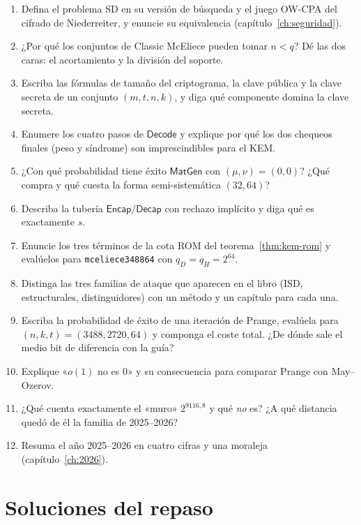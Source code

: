 \documentclass[11pt,a4paper,oneside]{report}
\begin{document}
\begin{enumerate}[leftmargin=1.9em,itemsep=5pt]
  \item Defina el problema SD en su versión de búsqueda y el juego
        OW-CPA del cifrado de Niederreiter, y enuncie su equivalencia
        (capítulo~\ref{ch:seguridad}).
  \item ¿Por qué los conjuntos de Classic McEliece pueden tomar
        $n<q$? Dé las dos caras: el acortamiento y la división del
        soporte.
  \item Escriba las fórmulas de tamaño del criptograma, la clave
        pública y la clave secreta de un conjunto $(m,t,n,k)$, y
        diga qué componente domina la clave secreta.
  \item Enumere los cuatro pasos de $\textsf{Decode}$ y explique por
        qué los dos chequeos finales (peso y síndrome) son
        imprescindibles para el KEM.
  \item ¿Con qué probabilidad tiene éxito $\textsf{MatGen}$ con
        $(\mu,\nu)=(0,0)$? ¿Qué compra y qué cuesta la forma
        semi-sistemática $(32,64)$?
  \item Describa la tubería $\textsf{Encap}/\textsf{Decap}$ con
        rechazo implícito y diga qué es exactamente $s$.
  \item Enuncie los tres términos de la cota ROM del
        teorema~\ref{thm:kem-rom} y evalúelos para
        \texttt{mceliece348864} con $q_D=q_H=2^{64}$.
  \item Distinga las tres familias de ataque que aparecen en el
        libro (ISD, estructurales, distinguidores) con un método y
        un capítulo para cada una.
  \item Escriba la probabilidad de éxito de una iteración de
        Prange, evalúela para $(n,k,t)=(3488,2720,64)$ y componga
        el coste total. ¿De dónde sale el medio bit de diferencia
        con la guía?
  \item Explique «$o(1)$ no es $0$» y su consecuencia para comparar
        Prange con May--Ozerov.
  \item ¿Qué cuenta exactamente el «muro» $2^{9116{,}8}$ y qué
        \emph{no} es? ¿A qué distancia quedó de él la familia de
        2025--2026?
  \item Resuma el año 2025--2026 en cuatro cifras y una moraleja
        (capítulo~\ref{ch:2026}).
\end{enumerate}

\section{Soluciones del repaso}\label{sec:sol-soluciones}
\end{document}
